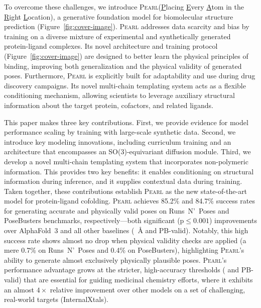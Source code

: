 \documentclass[11pt, letterpaper, onecolumn]{tau-class/tau}
\newcommand{\pearl}{\textsc{Pearl}\xspace}
\newcommand{\alphafold}[1]{AlphaFold~#1\xspace}
\newcommand{\rmsdonea}{\text{RMSD\,\raisebox{0.25ex}{\scriptsize <}\,1\,\AA}\xspace}
\newcommand{\rmsdtwo}{\text{RMSD\,\raisebox{0.25ex}{\scriptsize <}\,2}\xspace}
\newcommand{\runsnposes}{Runs~N'~Poses\xspace}
\newcommand{\posebusters}{PoseBusters\xspace}
\newcommand{\internalxtals}{InternalXtals\xspace}
\let\oldAA\AA
\renewcommand{\AA}{\oldAA\xspace}
\newcommand{\pval}[1]{\ensuremath{\mathrm{p} \leq #1}}
\begin{document}
To overcome these challenges, we introduce \pearl (\underline{P}lacing \underline{E}very \underline{A}tom in the \underline{R}ight \underline{L}ocation), a generative foundation model for biomolecular structure prediction (Figure~\ref{fig:cover-image}). 
\pearl addresses data scarcity and bias by training on a diverse mixture of experimental and synthetically generated protein-ligand complexes.
Its novel architecture and training protocol (Figure~\ref{fig:cover-image}) are designed to better learn the physical principles of binding, improving both generalization and the physical validity of generated poses.
Furthermore, \pearl is explicitly built for adaptability and use during drug discovery campaigns. 
Its novel multi-chain templating system acts as a flexible conditioning mechanism, allowing scientists to leverage auxiliary structural information about the target protein, cofactors, and related ligands.

This paper makes three key contributions.
First, we provide evidence for model performance scaling by training with large-scale synthetic data.
Second, we introduce key modeling innovations, including curriculum training and an architecture that encompasses an SO(3)-equivariant diffusion module.
Third, we develop a novel multi-chain templating system that incorporates non-polymeric information. This provides two key benefits: it enables conditioning on structural information during inference, and it supplies contextual data during training.
Taken together, these contributions establish \pearl as the new state-of-the-art model for protein-ligand cofolding.
\pearl achieves 85.2\% and 84.7\% success rates for generating accurate and physically valid poses on \runsnposes and \posebusters benchmarks, respectively---both significant (\pval{0.001}) improvements over \alphafold3 and all other baselines (\rmsdtwo~\AA and PB-valid). Notably, this high success rate shows almost no drop when physical validity checks are applied (a mere 0.7\% on \runsnposes and 0.4\% on \posebusters), highlighting \pearl's ability to generate almost exclusively physically plausible poses.
\pearl's performance advantage grows at the stricter, high-accuracy thresholds (\rmsdonea and PB-valid) that are essential for guiding medicinal chemistry efforts, where it exhibits an almost $4\times$ relative improvement over other models on a set of challenging, real-world targets (\internalxtals).
\end{document}
